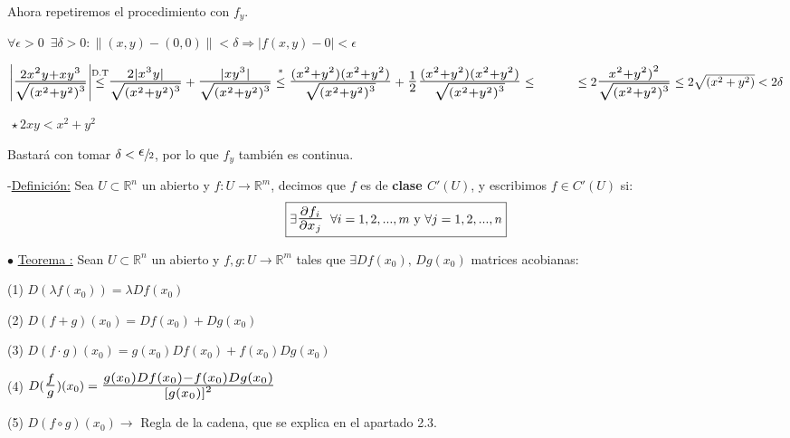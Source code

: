 \documentclass[10pt, titlepage]{article}
\newcommand{\leqc}[1]{\stackrel{\mathclap{\normalfont\mbox{\scriptsize{#1}}}}{\leq}}
\newcommand{\R}{\mathbb{R}}
\newcommand{\bfrac}[2]{\scalebox{1.4}{$\frac{#1}{#2}$}}
\newcommand{\spac}{\, \, \,}
\newcommand{\definicion}{\noindent-\underline{Definición:} }
\newcommand{\teorema}[1][\!\!]{\noindent$\bullet$ \underline{Teorema #1:} }
\newcommand{\dindent}{\indent\indent}
\newcommand{\limdef}[2]{$\forall \epsilon > 0 \spac \exists \delta > 0 : \|(x ,y) - #1\| < \delta \Rightarrow 
|f (x, y) - #2| < \epsilon$\vspace{3mm}

}
\begin{document}
\dindent Ahora repetiremos el procedimiento con $f_y$.
\vspace{3mm}

\dindent \limdef{(0, 0)}{0}

\dindent $\left | \bfrac{2x^2y + xy^3}{\sqrt{{(x^2 + y^2)}^3}} \right | \leqc{D.T} \bfrac{2 |x^3y|} 
{\sqrt{{(x^2 + y^2)}^3}} + \bfrac{|xy^3|}{\sqrt{{(x^2 + y^2)}^3}} \leqc{*} \bfrac{(x^2 + y^2)(x^2 +
y^2)}{\sqrt{{(x^2 + y^2)}^3}} + \bfrac{1}{2} \bfrac{(x^2 + y^2)(x^2 + y^2)}{\sqrt{{(x^2 
+ y^2)}^3}} \leq \\ \dindent \leq 2 \bfrac{{x^2 + y^2)}^2}{\sqrt{{(x^2 + y^2)}^3}} \leq 2 \sqrt{(x^2 +
y^2)} < 2 \delta$
\vspace{3mm}

\dindent $ \, \star 2xy < x^2 + y^2$
\vspace{3mm}

 \dindent Bastará con tomar $\delta < \sfrac{\scalebox{1.5}{$\epsilon$}}{2}$, por lo que $f_y$ también es continua.
\vspace{7mm}

\definicion Sea $U \subset \R^n$ un abierto y $f : U \to \R^m$, decimos que $f$ es de \textbf{clase 
$C' (U)$}, y escribimos $f \in C' (U)$ si:
\vspace{3mm}
\[
\boxed{
\exists \bfrac{\partial f_i}{\partial x_j} \spac \forall i = 1, 2,..., m \text{ y } \forall j = 1, 2,..., n
}
\]
\vspace{7mm}


\teorema Sean $U \subset \R^n$ un abierto y $f, g : U \to \R^m$ tales que $\exists Df (x_0) \text{, } Dg 
(x_0)$ matrices acobianas:
\vspace{3mm}

(1) $D (\lambda f (x_0)) = \lambda Df (x_0)$
\vspace{3mm}

(2) $D (f + g) (x_0) = Df (x_0) + Dg (x_0)$
\vspace{3mm}

(3) $D(f \cdot g) (x_0) = g (x_0) Df (x_0) + f (x_0) Dg (x_0)$
\vspace{3mm}

(4) $D (\bfrac{f}{g}) (x_0) = \bfrac{g (x_0) Df (x_0) - f (x_0) Dg (x_0)}{{[g (x_0)]}^2}$
\vspace{3mm}

(5) $D (f \circ g) (x_0) \rightarrow$ Regla de la cadena, que se explica en el apartado 2.3.
\vspace{7mm}
\end{document}
